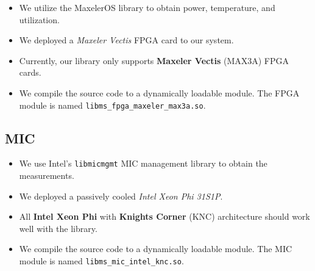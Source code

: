 \begin{itemize}
	\item We utilize the MaxelerOS library to obtain power, temperature, and utilization.
	\item We deployed a \textit{Maxeler Vectis} FPGA card to our system.
	\item Currently, our library only supports \textbf{Maxeler Vectis} (MAX3A) FPGA cards.
	\item We compile the source code to a dynamically loadable module. The FPGA module is named \texttt{libms\_fpga\_maxeler\_max3a.so}.
\end{itemize}

\subsection{MIC}

\begin{itemize}
	\item We use Intel's \texttt{libmicmgmt} MIC management library to obtain the measurements.
	\item We deployed a passively cooled \textit{Intel Xeon Phi 31S1P}.
	\item All \textbf{Intel Xeon Phi} with \textbf{Knights Corner} (KNC) architecture should work well with the library.
	\item We compile the source code to a dynamically loadable module. The MIC module is named \texttt{libms\_mic\_intel\_knc.so}.
\end{itemize}
